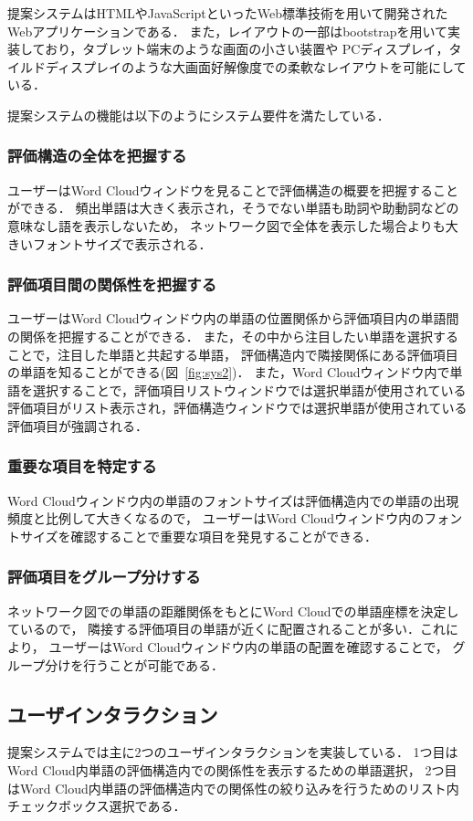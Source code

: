 \documentclass[syuuron]{kuee}
\begin{document}
			提案システムはHTMLやJavaScriptといったWeb標準技術を用いて開発されたWebアプリケーションである．
			また，レイアウトの一部はbootstrapを用いて実装しており，タブレット端末のような画面の小さい装置や
			PCディスプレイ，タイルドディスプレイのような大画面好解像度での柔軟なレイアウトを可能にしている．
			
			提案システムの機能は以下のようにシステム要件を満たしている．
			\subsubsection{評価構造の全体を把握する}
				ユーザーはWord Cloudウィンドウを見ることで評価構造の概要を把握することができる．
				頻出単語は大きく表示され，そうでない単語も助詞や助動詞などの意味なし語を表示しないため，
				ネットワーク図で全体を表示した場合よりも大きいフォントサイズで表示される．
			\subsubsection{評価項目間の関係性を把握する}
				ユーザーはWord Cloudウィンドウ内の単語の位置関係から評価項目内の単語間の関係を把握することができる．
				また，その中から注目したい単語を選択することで，注目した単語と共起する単語，
				評価構造内で隣接関係にある評価項目の単語を知ることができる(図~\ref{fig:sys2})．
				また，Word Cloudウィンドウ内で単語を選択することで，評価項目リストウィンドウでは選択単語が使用されている
				評価項目がリスト表示され，評価構造ウィンドウでは選択単語が使用されている
				評価項目が強調される．
			\subsubsection{重要な項目を特定する}
				Word Cloudウィンドウ内の単語のフォントサイズは評価構造内での単語の出現頻度と比例して大きくなるので，
				ユーザーはWord Cloudウィンドウ内のフォントサイズを確認することで重要な項目を発見することができる．
			\subsubsection{評価項目をグループ分けする}%
				ネットワーク図での単語の距離関係をもとにWord Cloudでの単語座標を決定しているので，
				隣接する評価項目の単語が近くに配置されることが多い．これにより，
				ユーザーはWord Cloudウィンドウ内の単語の配置を確認することで，
				グループ分けを行うことが可能である．
			
		\subsection{ユーザインタラクション}
			提案システムでは主に2つのユーザインタラクションを実装している．
			1つ目はWord Cloud内単語の評価構造内での関係性を表示するための単語選択，
			2つ目はWord Cloud内単語の評価構造内での関係性の絞り込みを行うためのリスト内チェックボックス選択である．
			
\end{document}
